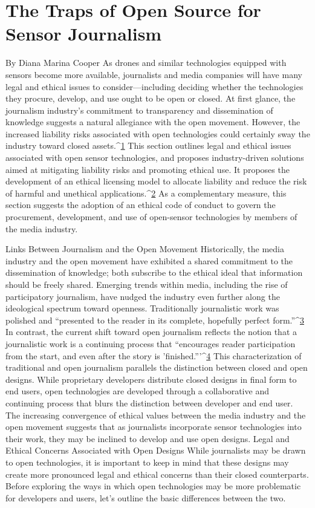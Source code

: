 \section{The Traps of Open Source for Sensor Journalism}
By Diana Marina Cooper
As drones and similar technologies equipped with sensors become more
available, journalists and media companies will have many legal and ethical
issues to consider—including deciding whether the technologies they procure,
develop, and use ought to be open or closed. At first glance, the journalism
industry's commitment to transparency and dissemination of
knowledge suggests a natural allegiance with the open movement. However,
the increased liability risks associated with open technologies could
certainly sway the industry toward closed assets.^{\href{#endnotes-cooper}{1}}
This section outlines legal and ethical issues associated with open sensor
technologies, and proposes industry-driven solutions aimed at mitigating
liability risks and promoting ethical use. It proposes the development of
an ethical licensing model to allocate liability and reduce the risk of harmful
and unethical applications.^{\href{#endnotes-cooper}{2}} As a complementary measure, this section
suggests the adoption of an ethical code of conduct to govern the procurement,
development, and use of open-sensor technologies by members of
the media industry.

Links Between Journalism and the Open Movement
Historically, the media industry and the open movement have exhibited a
shared commitment to the dissemination of knowledge; both subscribe to
the ethical ideal that information should be freely shared. Emerging trends
within media, including the rise of participatory journalism, have nudged
the industry even further along the ideological spectrum toward openness.
Traditionally journalistic work was polished and ``presented to the reader in
its complete, hopefully perfect form.''^{\href{#endnotes-cooper}{3}} In contrast, the current shift toward
open journalism reflects the notion that a journalistic work is a continuing
process that ``encourages reader participation from the start, and even after
the story is 'finished.'''^{\href{#endnotes-cooper}{4}} This characterization of traditional and open journalism
parallels the distinction between closed and open designs. While
proprietary developers distribute closed designs in final form to end users,
open technologies are developed through a collaborative and continuing
process that blurs the distinction between developer and end user.
The increasing convergence of ethical values between the media industry and
the open movement suggests that as journalists incorporate sensor technologies
into their work, they may be inclined to develop and use open designs.
Legal and Ethical Concerns Associated with
Open Designs
While journalists may be drawn to open technologies, it is important to
keep in mind that these designs may create more pronounced legal and
ethical concerns than their closed counterparts. Before exploring the ways
in which open technologies may be more problematic for developers and
users, let's outline the basic differences between the two.

